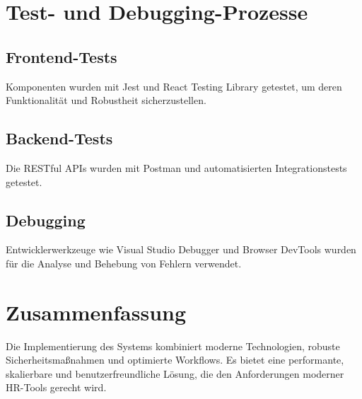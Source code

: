 \section{Test- und Debugging-Prozesse}
\subsection{Frontend-Tests}
Komponenten wurden mit Jest und React Testing Library getestet, um deren Funktionalität und Robustheit sicherzustellen.

\subsection{Backend-Tests}
Die RESTful APIs wurden mit Postman und automatisierten Integrationstests getestet.

\subsection{Debugging}
Entwicklerwerkzeuge wie Visual Studio Debugger und Browser DevTools wurden für die Analyse und Behebung von Fehlern verwendet.

\section{Zusammenfassung}
Die Implementierung des Systems kombiniert moderne Technologien, robuste Sicherheitsmaßnahmen und optimierte Workflows. Es bietet eine performante, skalierbare und benutzerfreundliche Lösung, die den Anforderungen moderner HR-Tools gerecht wird.
